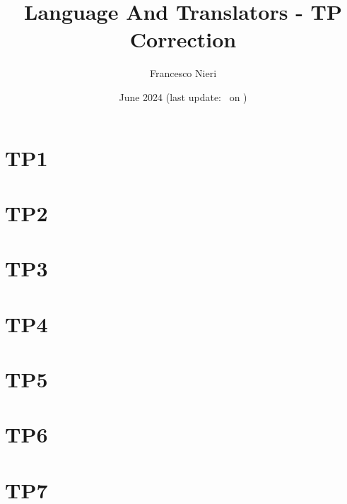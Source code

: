 \documentclass{article}
\title{Language And Translators - TP Correction}
\author{Francesco Nieri}
\date{June 2024 (last update: \commitHash \  on \commitDate)}
\begin{document}
\maketitle
\tableofcontents
\newpage
\section{TP1}
    
\newpage
\section{TP2}
    
\newpage
\section{TP3}
    
\newpage
\section{TP4}
    
\newpage
\section{TP5}
    
\newpage
\section{TP6}
    
\newpage
\section{TP7}
    
\end{document}
